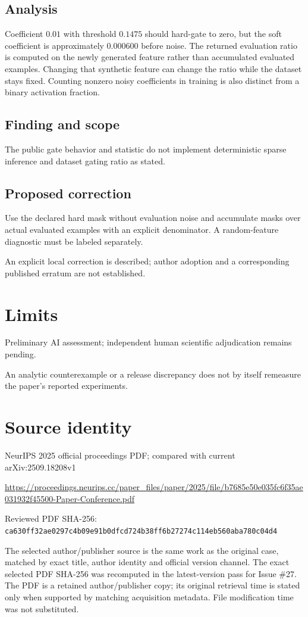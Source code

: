 \documentclass[11pt]{article}
\begin{document}
\subsection*{Analysis}

Coefficient \(0.01\) with threshold \(0.1475\) should hard-gate to zero, but the soft coefficient is approximately \(0.000600\) before noise. The returned evaluation ratio is computed on the newly generated feature rather than accumulated evaluated examples. Changing that synthetic feature can change the ratio while the dataset stays fixed. Counting nonzero noisy coefficients in training is also distinct from a binary activation fraction.

\subsection*{Finding and scope}

The public gate behavior and statistic do not implement deterministic sparse inference and dataset gating ratio as stated.

\subsection*{Proposed correction}

Use the declared hard mask without evaluation noise and accumulate masks over actual evaluated examples with an explicit denominator. A random-feature diagnostic must be labeled separately.

An explicit local correction is described; author adoption and a corresponding published erratum are not established.

\section*{Limits}

Preliminary AI assessment; independent human scientific adjudication remains pending.\par

An analytic counterexample or a release discrepancy does not by itself remeasure the paper’s reported experiments.\par

\section*{Source identity}

NeurIPS 2025 official proceedings PDF; compared with current arXiv:2509.18208v1

\url{https://proceedings.neurips.cc/paper_files/paper/2025/file/b7685e50e035fc6f35ae031932f45500-Paper-Conference.pdf}

Reviewed PDF SHA-256: \nolinkurl{ca630ff32ae0297c4b09e91b0dfcd724b38ff6b27274c114eb560aba780c04d4}

The selected author/publisher source is the same work as the original case, matched by exact title, author identity and official version channel. The exact selected PDF SHA-256 was recomputed in the latest-version pass for Issue \#27. The PDF is a retained author/publisher copy; its original retrieval time is stated only when supported by matching acquisition metadata. File modification time was not substituted.
\end{document}
